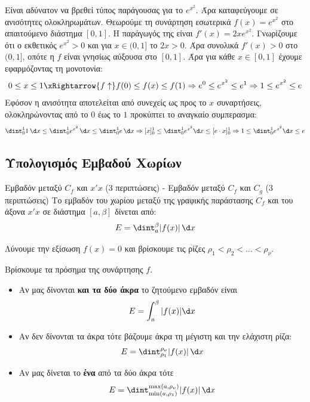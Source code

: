 \lysh
Είναι αδύνατον να βρεθεί τύπος παράγουσας για το $e^{x^2}$. Άρα καταφεύγουμε σε ανισότητες ολοκληρωμάτων. Θεωρούμε τη συνάρτηση εσωτερικά $f(x) = e^{x^2}$ στο απαιτούμενο διάστημα $[0, 1]$.
Η παράγωγός της είναι $f'(x) = 2x e^{x^2}$. Γνωρίζουμε ότι ο εκθετικός $e^{x^2} > 0$ και για $x \in (0, 1]$ το $2x > 0$.
Άρα συνολικά $f'(x) > 0$ στο $(0, 1]$, οπότε η $f$ είναι γνησίως αύξουσα στο $[0, 1]$.
Άρα για κάθε $x \in [0, 1]$ έχουμε εφαρμόζοντας τη μονοτονία:
\[ 0 \le x \le 1 \xRightarrow{f \uparrow} f(0) \le f(x) \le f(1) \Rightarrow e^0 \le e^{x^2} \le e^1 \Rightarrow 1 \le e^{x^2} \le e \]
Εφόσον η ανισότητα αποτελείται από συνεχείς ως προς το $x$ συναρτήσεις, ολοκληρώνοντας από το $0$ έως το $1$ προκύπτει το αναγκαίο συμπερασμα:
\[ \dint_0^1 1 \, \d x \le \dint_0^1 e^{x^2} \, \d x \le \dint_0^1 e \, \d x \Rightarrow [x]_0^1 \le \dint_0^1 e^{x^2} \d x \le [e\cdot x]_0^1 \Rightarrow 1 \le \dint_0^1 e^{x^2} \d x \le e \]


\subsection{Υπολογισμός Εμβαδού Χωρίων}
\begin{askhsh}{Εμβαδόν μεταξύ $C_f$ και $x'x$ (3 περιπτώσεις) - Εμβαδόν μεταξύ $C_f$ και $C_g$ (3 περιπτώσεις)}
Το εμβαδόν του χωρίου μεταξύ της γραφικής παράστασης $C_f$ και του άξονα $x'x$ σε διάστημα $[a,\beta]$ δίνεται από:
\[E=\dint_a^\beta |f(x)|\,\d x\]
\bhmata
\begin{bhma}
\item Λύνουμε την εξίσωση $f(x)=0$ και βρίσκουμε τις ρίζες $\rho_1<\rho_2<\ldots<\rho_\nu$.
\item Βρίσκουμε τα πρόσημα της συνάρτησης $f$.
\item \begin{itemize}
\item Αν μας δίνονται \textbf{και τα δύο άκρα} το ζητούμενο εμβαδόν είναι
\[E=\int_{a}^{\beta}{|f(x)|\d x}\]
    \item Αν δεν δίνονται τα άκρα τότε βάζουμε άκρα τη μέγιστη και την ελάχιστη ρίζα:
    \[E=\dint_{\rho_1}^{\rho_\nu}|f(x)|\,\d x\]
    \item Αν μας δίνεται το \textbf{ένα} από τα δύο άκρα τότε
    \[E=\dint_{\min(a,\rho_1)}^{\max(a,\rho_\nu)}|f(x)|\,\d x\]
\end{itemize}
\end{bhma}
\begin{center}
\end{center}
\end{askhsh}

